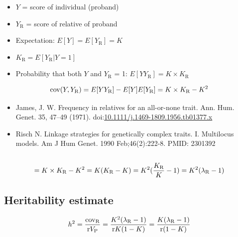 \documentclass[
  letterpaper,
  DIV=11,
  numbers=noendperiod]{scrartcl}
\providecommand{\tightlist}{%
  \setlength{\itemsep}{0pt}\setlength{\parskip}{0pt}}
\begin{document}
\begin{itemize}
\tightlist
\item
  \(Y\) = score of individual (proband)
\item
  \(Y_\mathrm{R}\) = score of relative of proband
\item
  Expectation: \(E[Y] = E[Y_\mathrm{R}] = K\)
\item
  \(K_\mathrm{R} = E[Y_\mathrm{R} | Y = 1]\)
\item
  Probability that both \(Y\) and \(Y_\mathrm{R}\) = 1:
  \(E[YY_\mathrm{R}] = K \times K_\mathrm{R}\)
\end{itemize}

\[
\mathrm{cov}(Y, Y_\mathrm{R}) = E[YY_\mathrm{R}] - E[Y] E[Y_\mathrm{R}] \\
= K \times K_\mathrm{R} - K^2 \\
\]

\begin{itemize}
\tightlist
\item
  James, J. W. Frequency in relatives for an all-or-none trait. Ann.
  Hum. Genet. 35, 47--49 (1971).
  doi:\href{https://doi.org/10.1111/j.1469-1809.1956.tb01377.x}{10.1111/j.1469-1809.1956.tb01377.x}
\item
  Risch N. Linkage strategies for genetically complex traits. I.
  Multilocus models. Am J Hum Genet. 1990 Feb;46(2):222-8. PMID: 2301392
\end{itemize}

\subsection{}\label{section-7}

\[
= K \times K_\mathrm{R} - K^2 \\
= K(K_\mathrm{R} - K) \\
= K^2 (\frac{K_\mathrm{R}}{K} - 1) \\
= K^2 (\lambda_\mathrm{R} - 1)
\]

\subsection{Heritability estimate}\label{heritability-estimate}

\[
h^2 = \frac{\mathrm{cov}_\mathrm{R}}{\mathrm{r}V_\mathrm{P}} \\
= \frac{K^2 (\lambda_\mathrm{R} - 1)}{\mathrm{r}K(1-K)} \\
= \frac{K (\lambda_\mathrm{R} - 1)}{\mathrm{r}(1-K)} \\
\]
\end{document}
